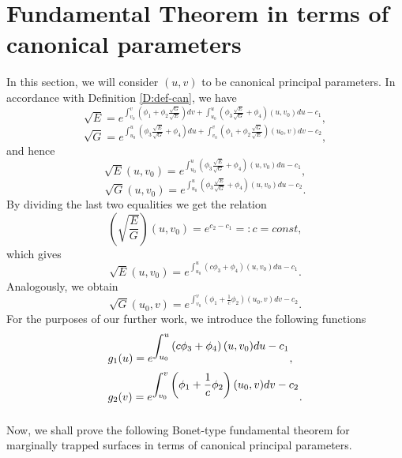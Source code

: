 \documentclass[12pt]{amsart}
\theoremstyle{definition}
\theoremstyle{remark}
\newcommand{\ds}{\displaystyle}
\numberwithin{equation}{section}
\begin{document}
\section{Fundamental Theorem in terms of canonical parameters}

In this section, we will consider $(u,v)$ to be canonical principal parameters. In accordance with Definition \ref{D:def-can}, we have
$$
\ds\sqrt E=e^{\ds\int_{v_0}^v\left(\phi_1+\phi_2\frac{\sqrt G}{\sqrt E}\right)dv
	+\int_{u_0}^u\left(\phi_3\frac{\sqrt E}{\sqrt G}+\phi_4\right)(u,v_0)du-c_1},
$$
$$
\ds\sqrt G=e^{\ds\int_{u_0}^u\left(\phi_3\frac{\sqrt E}{\sqrt G}+\phi_4\right)du
	+\int_{v_0}^v\left(\phi_1+\phi_2\frac{\sqrt G}{\sqrt E}\right)(u_0,v)dv-c_2},
$$
and hence 
$$
\ds\sqrt E(u,v_0)=e^{\ds\int_{u_0}^u\left(\phi_3\frac{\sqrt E}{\sqrt G}+\phi_4\right)(u,v_0)du-c_1},
$$
$$
\ds\sqrt G(u,v_0)=e^{\ds\int_{u_0}^u\left(\phi_3\frac{\sqrt E}{\sqrt G}+\phi_4\right)(u,v_0)du-c_2}.
$$
By dividing the last two equalities we get the relation
$$
\left(\ds\sqrt {\frac{E}{G}}\right)(u,v_0)=e^{c_2-c_1}=:c= const,
$$
which gives
$$
\ds\sqrt E(u,v_0)=e^{\ds\int_{u_0}^u\left(c\phi_3+\phi_4\right)(u,v_0)du-c_1}.
$$
Analogously, we obtain
$$
\ds\sqrt G(u_0,v)=e^{\ds\int_{v_0}^v\left(\phi_1+\frac 1c\phi_2\right)(u_0,v)dv-c_2}.
$$
For the purposes of our further work, we introduce the following functions
\begin{equation} \label{eq:g1&g2}
	\begin{array}{l}
		\vspace{2mm}
		\ds g_1(u)=e^{\ds\int_{u_0}^u\left(c\phi_3+\phi_4\right)(u,v_0)du-c_1}, \\
		\vspace{2mm}
		\ds g_2(v)=e^{\ds\int_{v_0}^v\left(\phi_1+\frac 1c\phi_2\right)(u_0,v)dv-c_2}.
	\end{array}
\end{equation}    


Now, we shall prove the following Bonet-type fundamental theorem for marginally trapped surfaces in terms of canonical principal parameters.
\end{document}
